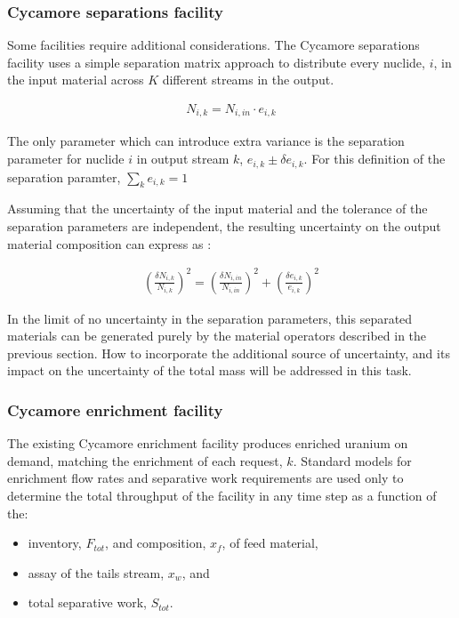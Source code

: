 \documentclass[dvips,12pt]{article}
\newcommand{\unc}[1]
{ \delta #1 }
\newcommand{\uncratio}[1]
{ \left(\frac{\unc{#1}}{#1}\right) }
\newcommand{\uncratiosq}[1]
{ \uncratio{#1}^2 }
\begin{document}
\subsubsection{Cycamore separations facility}

Some facilities require additional considerations.
The Cycamore separations facility uses a simple
separation matrix approach to distribute every
nuclide, $i$, in the input material across $K$
different streams in the output.

\begin{align}
N_{i,k} = N_{i,in} \cdot e_{i,k}
\end{align}

The only parameter which can introduce extra
variance is the separation parameter for nuclide
$i$ in output stream $k$, $e_{i,k} \pm \delta
e_{i,k}$.  For this definition of the separation
paramter, $\sum_k e_{i,k} = 1$

Assuming that the uncertainty of the input
material and the tolerance of the separation
parameters are independent, the resulting
uncertainty on the output material composition can
express as :

\begin{align}
  \uncratiosq{N_{i,k}} = \uncratiosq{N_{i,in}} +  \uncratiosq{e_{i,k}}
\end{align}

In the limit of no uncertainty in the separation
parameters, this separated materials can be
generated purely by the material operators
described in the previous section.  How to
incorporate the additional source of uncertainty,
and its impact on the uncertainty of the total
mass will be addressed in this task.

\subsubsection{Cycamore enrichment facility}

The existing Cycamore enrichment facility produces
enriched uranium on demand, matching the
enrichment of each request, $k$.  Standard models
for enrichment flow rates and separative work
requirements are used only to determine the total
throughput of the facility in any time step as a
function of the:
\begin{itemize}
\item inventory, $F_{tot}$, and composition,
  $x_f$, of feed material,
\item assay of the tails stream, $x_w$, and
\item total separative work, $S_{tot}$.
\end{itemize}
\end{document}
